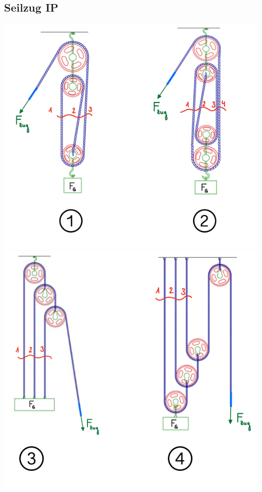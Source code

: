 \subsection{Seilzug \hfill IP}
\begin{footnotesize}
    \begin{center}
        \begin{minipage}{0.58\linewidth}
            \includegraphics[width = 1.0\linewidth]{MAEIP_Seilzug1}
            \\\includegraphics[width = 0.9\linewidth]{MAEIP_Seilzug2}

\end{minipage}
\end{center}
\end{footnotesize}
